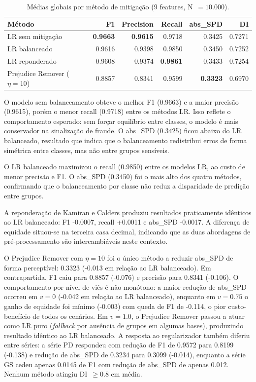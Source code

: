 \begin{table}[H]
\centering
\caption{Médias globais por método de mitigação (9 features,
N~$= 10.000$).}
\label{tab:mitigacao}
\begin{tabular}{lrrrrr}
\toprule
\textbf{Método} & \textbf{F1} & \textbf{Precision} & \textbf{Recall}
  & \textbf{abs\_SPD} & \textbf{DI} \\
\midrule
LR sem mitigação              & \textbf{0.9663} & \textbf{0.9615} & 0.9718 & 0.3425 & 0.7271 \\
LR balanceado                 & 0.9616 & 0.9398 & 0.9850          & 0.3450 & 0.7252 \\
LR reponderado                & 0.9608 & 0.9374 & \textbf{0.9861} & 0.3433 & 0.7254 \\
Prejudice Remover ($\eta=10$) & 0.8857 & 0.8341 & 0.9599          & \textbf{0.3323} & 0.6970 \\
\bottomrule
\end{tabular}
\end{table}

O modelo sem balanceamento obteve o melhor F1 (0.9663) e a maior precisão (0.9615), porém o menor recall (0.9718) entre os métodos LR. Isso reflete o comportamento esperado: sem forçar equilíbrio entre classes, o modelo é mais conservador na sinalização de fraude. O abs\_SPD (0.3425) ficou abaixo do LR balanceado, resultado que indica que o balanceamento redistribui erros de forma simétrica entre classes, mas não entre grupos sensíveis.

O LR balanceado maximizou o recall (0.9850) entre os modelos LR, ao custo de menor precisão e F1. O abs\_SPD (0.3450) foi o mais alto dos quatro métodos, confirmando que o balanceamento por classe não reduz a disparidade de predição entre grupos.

A reponderação de Kamiran e Calders produziu resultados praticamente idênticos ao LR balanceado: F1 -0.0007, recall +0.0011 e abs\_SPD -0.0017. A diferença de equidade situou-se na terceira casa decimal, indicando que as duas abordagens de pré-processamento são intercambiáveis neste contexto.

O Prejudice Remover com $\eta = 10$ foi o único método a reduzir abs\_SPD de forma perceptível: 0.3323 (-0.013 em relação ao LR balanceado). Em contrapartida, F1 caiu para 0.8857 (-0.076) e precisão para 0.8341 (-0.106). O comportamento por nível de viés é não monótono: a maior redução de abs\_SPD ocorreu em $v = 0$ (-0.042 em relação ao LR balanceado), enquanto em $v = 0.75$ o ganho de equidade foi mínimo (-0.003) com queda de F1 de -0.114, o pior custo-benefício de todos os cenários. Em $v = 1.0$, o Prejudice Remover passou a atuar como LR puro (\textit{fallback} por ausência de grupos em algumas bases), produzindo resultado idêntico ao LR balanceado. A resposta ao regularizador também diferiu entre séries: a série PD respondeu com redução de F1 de 0.9572 para 0.8199 (-0.138) e redução de abs\_SPD de 0.3234 para 0.3099 (-0.014), enquanto a série GS cedeu apenas 0.0145 de F1 com redução de abs\_SPD de apenas 0.012. Nenhum método atingiu DI~$\geq 0.8$ em média.

